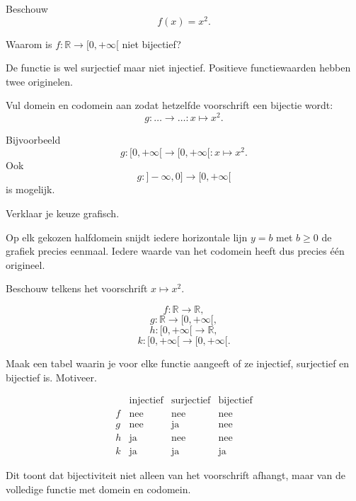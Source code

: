 \documentclass{ximera}
\begin{document}
\begin{oefening}{\oefB\ESS}

Beschouw
\[
f(x)=x^2.
\]

\begin{question}
Waarom is \(f:\mathbb R\to[0,+\infty[\) niet bijectief?

\begin{oplossing}
De functie is wel surjectief maar niet injectief.
Positieve functiewaarden hebben twee originelen.
\end{oplossing}
\end{question}

\begin{question}
Vul domein en codomein aan zodat hetzelfde voorschrift een bijectie wordt:
\[
g:\ldots\to\ldots:x\mapsto x^2.
\]

\begin{oplossing}
Bijvoorbeeld
\[
g:[0,+\infty[\to[0,+\infty[:x\mapsto x^2.
\]
Ook
\[
g:]-\infty,0]\to[0,+\infty[
\]
is mogelijk.
\end{oplossing}
\end{question}

\begin{question}
Verklaar je keuze grafisch.

\begin{oplossing}
Op elk gekozen halfdomein snijdt iedere horizontale lijn \(y=b\) met \(b\geq0\)
de grafiek precies eenmaal. Iedere waarde van het codomein heeft dus precies
één origineel.
\end{oplossing}
\end{question}

\end{oefening}



\begin{oefening}{\oefU\ESS}

Beschouw telkens het voorschrift \(x\mapsto x^2\).

\[
f:\mathbb R\to\mathbb R,
\]
\[
g:\mathbb R\to[0,+\infty[,
\]
\[
h:[0,+\infty[\to\mathbb R,
\]
\[
k:[0,+\infty[\to[0,+\infty[.
\]

Maak een tabel waarin je voor elke functie aangeeft of ze injectief,
surjectief en bijectief is. Motiveer.

\begin{oplossing}
\[
\begin{array}{c|ccc}
&\text{injectief}&\text{surjectief}&\text{bijectief}\\
\hline
f&\text{nee}&\text{nee}&\text{nee}\\
g&\text{nee}&\text{ja}&\text{nee}\\
h&\text{ja}&\text{nee}&\text{nee}\\
k&\text{ja}&\text{ja}&\text{ja}
\end{array}
\]

Dit toont dat bijectiviteit niet alleen van het voorschrift afhangt,
maar van de volledige functie met domein en codomein.
\end{oplossing}

\end{oefening}
\end{document}

